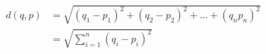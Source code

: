 \documentclass[preview]{standalone}
\begin{document}
\begin{align*}
d(q,p) &= \sqrt{(q_1-p_1)^2+(q_2-p_2)^2+...+(q_n p_n)^2}\\ &=\sqrt{\sum_{i=1}^n (q_i-p_i)^2}
\end{align*}
\end{document}
